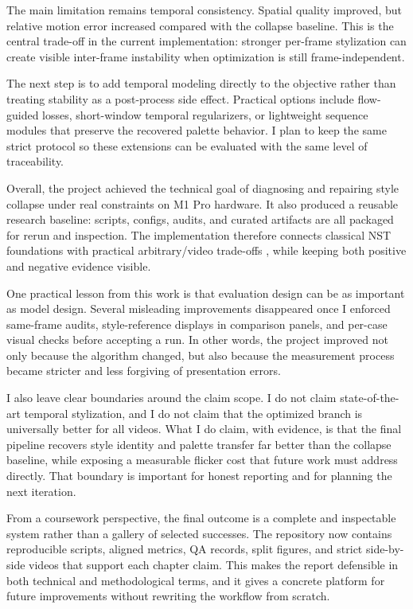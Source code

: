 \documentclass[12pt,letterpaper]{article}
\begin{document}
The main limitation remains temporal consistency. Spatial quality improved, but relative motion error increased compared with the collapse baseline. This is the central trade-off in the current implementation: stronger per-frame stylization can create visible inter-frame instability when optimization is still frame-independent.

The next step is to add temporal modeling directly to the objective rather than treating stability as a post-process side effect. Practical options include flow-guided losses, short-window temporal regularizers, or lightweight sequence modules that preserve the recovered palette behavior. I plan to keep the same strict protocol so these extensions can be evaluated with the same level of traceability.

Overall, the project achieved the technical goal of diagnosing and repairing style collapse under real constraints on M1 Pro hardware. It also produced a reusable research baseline: scripts, configs, audits, and curated artifacts are all packaged for rerun and inspection. The implementation therefore connects classical NST foundations \cite{gatys2016} with practical arbitrary/video trade-offs \cite{huang2017} \cite{ruder2016}, while keeping both positive and negative evidence visible.

One practical lesson from this work is that evaluation design can be as important as model design. Several misleading improvements disappeared once I enforced same-frame audits, style-reference displays in comparison panels, and per-case visual checks before accepting a run. In other words, the project improved not only because the algorithm changed, but also because the measurement process became stricter and less forgiving of presentation errors.

I also leave clear boundaries around the claim scope. I do not claim state-of-the-art temporal stylization, and I do not claim that the optimized branch is universally better for all videos. What I do claim, with evidence, is that the final pipeline recovers style identity and palette transfer far better than the collapse baseline, while exposing a measurable flicker cost that future work must address directly. That boundary is important for honest reporting and for planning the next iteration.

From a coursework perspective, the final outcome is a complete and inspectable system rather than a gallery of selected successes. The repository now contains reproducible scripts, aligned metrics, QA records, split figures, and strict side-by-side videos that support each chapter claim. This makes the report defensible in both technical and methodological terms, and it gives a concrete platform for future improvements without rewriting the workflow from scratch.
\end{document}
